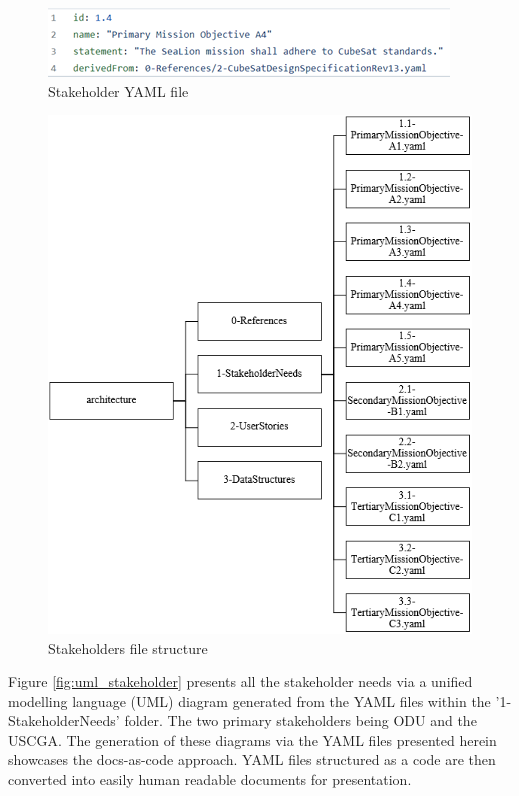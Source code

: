 \documentclass[journal,article,submit,pdftex,moreauthors]{Definitions/mdpi}
\begin{document}
\begin{figure}[H]
    \includegraphics[width=10.5 cm]{assets/stakeholder.png}
    \caption{Stakeholder YAML file}
	\label{fig:stakeholder_yaml}
    \end{figure}   
\unskip

\begin{figure}[H]
    \includegraphics[width=10.5 cm]{assets/stakeholder_file.png}
    \caption{Stakeholders file structure}
	\label{fig:stakeholder_file}
    \end{figure}
	\noindent   
\unskip

Figure \ref{fig:uml_stakeholder} presents all the stakeholder needs via a unified modelling language (UML) diagram generated from the YAML files within the '1-StakeholderNeeds' folder.  The two primary stakeholders being ODU and the USCGA.  The generation of these diagrams via the YAML files presented herein showcases the docs-as-code approach.  YAML files structured as a code are then converted into easily human readable documents for presentation.
\end{document}
